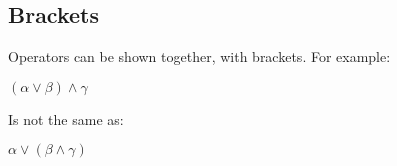 \subsection{Brackets}

Operators can be shown together, with brackets. For example:

\((\alpha \lor \beta )\land \gamma \)

Is not the same as:

\(\alpha \lor (\beta \land \gamma )\)


